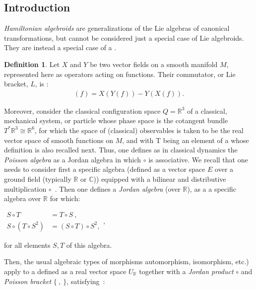 \documentclass[12pt]{article}
\theoremstyle{plain}
\theoremstyle{definition}
\newtheorem{definition}{Definition}[section]
\numberwithin{equation}{section}
\newcommand{\bC}{\mathbb{C}}
\newcommand{\bR}{\mathbb{R}}
\begin{document}
\subsection{Introduction}

\emph{Hamiltonian algebroids} are generalizations of the Lie algebras of canonical transformations, but cannot be considered just a special case of Lie algebroids. They are instead a special case of a .

\begin{definition}
  Let $X$ and $Y$ be two vector fields on a smooth manifold $M$, represented here as operators acting on functions.
Their commutator, or Lie bracket, $L$, is :
\begin{align*}
[X,Y](f)=X(Y(f))-Y(X(f)).
\end {align*}

 
  Moreover, consider the classical configuration space $Q = \bR^3$ of a classical, mechanical system, or particle whose phase space is the cotangent bundle $T^* \bR^3 \cong \bR^6$, for which the space of (classical) 
observables is taken to be the real vector space of smooth functions on $M$, and with T being an element
of a  whose definition is also recalled next. Thus, one defines as in classical dynamics the \emph{Poisson algebra} as a Jordan algebra in which $\circ$ is associative. We recall that one needs to consider first a specific algebra (defined as a vector space $E$ over a ground field (typically $\bR$ or $\bC$)) equipped with a bilinear and distributive multiplication $\circ$~. Then one defines a \emph{Jordan algebra} (over $\bR$), as a a specific algebra over $\bR$ for which:

\bigbreak

 $ \begin{aligned} S \circ T &= T \circ S~, \\ S \circ (T \circ S^2) &= (S \circ T) \circ S^2 , 
\end{aligned},$

for all elements $S, T$ of this algebra.

 Then, the usual algebraic types of morphisms automorphism, isomorphism, etc.) apply to a
 defined as a real vector space $U_{\bR}$  together with a \emph{Jordan product} $\circ$ and \emph{Poisson bracket}
\bigbreak
$\{~,~\}$, satisfying~:


\end{definition}
\end{document}

